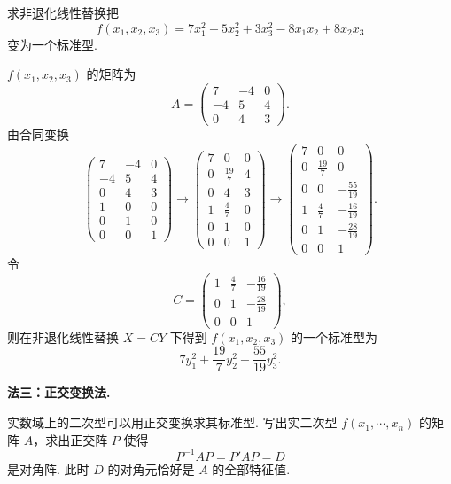 \begin{example}
	求非退化线性替换把
	\[
	f(x_1,x_2,x_3)=7x_1^2+5x_2^2+3x_3^2-8x_1x_2+8x_2x_3
	\]
	变为一个标准型.
	
	$f(x_1,x_2,x_3)$ 的矩阵为
	\[
	A=\begin{pmatrix}
		7&-4&0\\
		-4&5&4\\
		0&4&3
	\end{pmatrix}.
	\]
	由合同变换
	\[
	\left(\begin{array}{ccc}
		7&-4&0\\
		-4&5&4\\
		0&4&3\\ \hline
		1&0&0\\
		0&1&0\\
		0&0&1
	\end{array}\right)
	\longrightarrow
	\left(\begin{array}{ccc}
		7&0&0\\
		0&\frac{19}{7}&4\\
		0&4&3\\ \hline
		1&\frac47&0\\
		0&1&0\\
		0&0&1
	\end{array}\right)
	\longrightarrow
	\left(\begin{array}{ccc}
		7&0&0\\
		0&\frac{19}{7}&0\\
		0&0&-\frac{55}{19}\\ \hline
		1&\frac47&-\frac{16}{19}\\
		0&1&-\frac{28}{19}\\
		0&0&1
	\end{array}\right).
	\]
	令
	\[
	C=\begin{pmatrix}
		1&\frac47&-\frac{16}{19}\\
		0&1&-\frac{28}{19}\\
		0&0&1
	\end{pmatrix},
	\]
	则在非退化线性替换 $X=CY$ 下得到 $f(x_1,x_2,x_3)$ 的一个标准型为
	\[
	7y_1^2+\frac{19}{7}y_2^2-\frac{55}{19}y_3^2.
	\]
\end{example}

\noindent\textbf{法三：正交变换法.}

实数域上的二次型可以用正交变换求其标准型. 写出实二次型 $f(x_1,\cdots,x_n)$ 的矩阵 $A$，求出正交阵 $P$ 使得
\[
P^{-1}AP=P'AP=D
\]
是对角阵. 此时 $D$ 的对角元恰好是 $A$ 的全部特征值.





